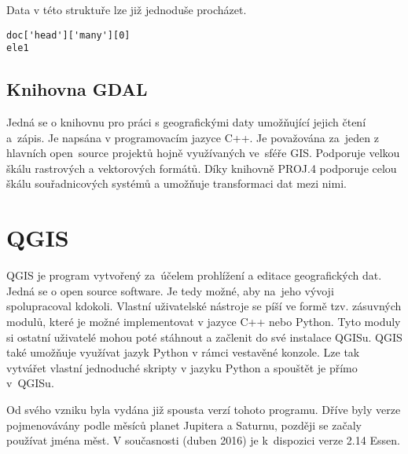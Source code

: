 Data v této struktuře lze již jednoduše procházet.

{\scriptsize
\lstset{language=Python}
\begin{lstlisting}
doc['head']['many'][0]
ele1
\end{lstlisting}
}

\subsection{Knihovna GDAL}
\label{GDAL}
Jedná se o knihovnu pro práci s geografickými daty umožňující jejich
čtení a~zápis. Je napsána v programovacím jazyce C++. Je považována
za~jeden z hlavních open~source projektů hojně využívaných ve~sféře
GIS. Podporuje velkou škálu rastrových a vektorových formátů.
Díky knihovně PROJ.4 podporuje celou škálu souřadnicových systémů a umožňuje transformaci dat mezi nimi. \cite{GDAL}

\section{QGIS}
\label{QGIS}
QGIS je program vytvořený za~účelem prohlížení a editace geografických
dat. Jedná se o open source software. Je tedy možné, aby na~jeho vývoji
spolupracoval kdokoli. Vlastní uživatelské nástroje se píší ve formě tzv. zásuvných modulů, které je možné implementovat v jazyce C++ nebo Python.
Tyto moduly si ostatní uživatelé mohou poté stáhnout a začlenit do své instalace QGISu. QGIS také umožňuje využívat jazyk Python v rámci vestavěné konzole. Lze tak vytvářet vlastní jednoduché skripty v jazyku Python a spouštět
je přímo v~QGISu.

Od svého vzniku byla vydána již spousta verzí tohoto programu. Dříve byly
verze pojmenovávány podle měsíců planet Jupitera a Saturnu, později se začaly používat jména měst. V současnosti (duben 2016) je
k~dispozici verze 2.14 Essen.
